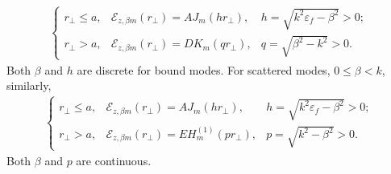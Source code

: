\documentclass[]{report}
\begin{document}
\begin{align}
\left\{
 \begin{array}{lcll}
	r\!_\perp \leq a, & \mathcal{E}_{z,\beta m}(r\!_\perp )\!=\! AJ_m(h r\!_\perp), & h \!=\! 
	\sqrt{k^2\varepsilon_f-\beta^2}\! >\! 0;\\
	r\!_\perp > a, & \mathcal{E}_{z,\beta m}(r\!_\perp )\!=\!DK_m(q r\!_\perp), & q\!=\! 
	\sqrt{\beta^2-k^2}>0.
 \end{array}\right.
\end{align}
Both $ \beta $ and $ h $ are discrete for bound modes. 
For scattered modes, $ 0\leq \beta< k $, similarly, 
\begin{align}
\left\{
 \begin{array}{lcll}
	r\!_\perp \leq a, & \mathcal{E}_{z,\beta m}(r\!_\perp )\!=\! AJ_m(h r\!_\perp), & h \!=\! 
	\sqrt{k^2\varepsilon_f-\beta^2}\! >\! 0;\\
	r\!_\perp > a, & \mathcal{E}_{z,\beta m}(r\!_\perp )\!=\!EH_m^{(\!1\!)}(p r\!_\perp\!), & p\!\!=\!\! 
	\sqrt{k^2-\beta^2}>0.
 \end{array}\right.
\end{align}
Both $ \beta $ and $ p $ are continuous. 
\end{document}
